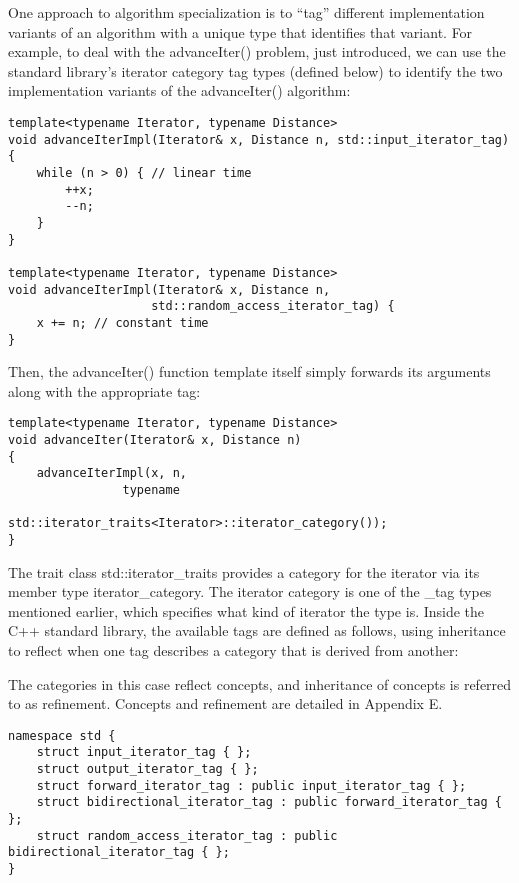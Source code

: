 One approach to algorithm specialization is to “tag” different implementation variants of an algorithm with a unique type that identifies that variant. For example, to deal with the advanceIter() problem, just introduced, we can use the standard library’s iterator category tag types (defined below) to identify the two implementation variants of the advanceIter() algorithm:

\begin{lstlisting}[style=styleCXX]
template<typename Iterator, typename Distance>
void advanceIterImpl(Iterator& x, Distance n, std::input_iterator_tag)
{
	while (n > 0) { // linear time
		++x;
		--n;
	}
}

template<typename Iterator, typename Distance>
void advanceIterImpl(Iterator& x, Distance n,
					std::random_access_iterator_tag) {
	x += n; // constant time
}
\end{lstlisting}

Then, the advanceIter() function template itself simply forwards its arguments along with the appropriate tag:

\begin{lstlisting}[style=styleCXX]
template<typename Iterator, typename Distance>
void advanceIter(Iterator& x, Distance n)
{
	advanceIterImpl(x, n,
				typename
						std::iterator_traits<Iterator>::iterator_category());
}
\end{lstlisting}

The trait class std::iterator\_traits provides a category for the iterator via its member type iterator\_category. The iterator category is one of the \_tag types mentioned earlier, which specifies what kind of iterator the type is. Inside the C++ standard library, the available tags are defined as follows, using inheritance to reflect when one tag describes a category that is derived from another:

\begin{tcolorbox}[colback=webgreen!5!white,colframe=webgreen!75!black]
\hspace*{0.75cm}The categories in this case reflect concepts, and inheritance of concepts is referred to as refinement. Concepts and refinement are detailed in Appendix E.
\end{tcolorbox}

\begin{lstlisting}[style=styleCXX]
namespace std {
	struct input_iterator_tag { };
	struct output_iterator_tag { };
	struct forward_iterator_tag : public input_iterator_tag { };
	struct bidirectional_iterator_tag : public forward_iterator_tag { };
	struct random_access_iterator_tag : public bidirectional_iterator_tag { };
}
\end{lstlisting}

